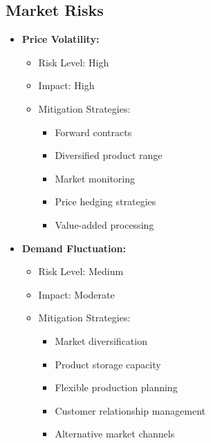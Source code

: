 \subsection{Market Risks}
\begin{itemize}
    \item \textbf{Price Volatility:}
    \begin{itemize}
        \item Risk Level: High
        \item Impact: High
        \item Mitigation Strategies:
        \begin{itemize}
            \item Forward contracts
            \item Diversified product range
            \item Market monitoring
            \item Price hedging strategies
            \item Value-added processing
        \end{itemize}
    \end{itemize}
    
    \item \textbf{Demand Fluctuation:}
    \begin{itemize}
        \item Risk Level: Medium
        \item Impact: Moderate
        \item Mitigation Strategies:
        \begin{itemize}
            \item Market diversification
            \item Product storage capacity
            \item Flexible production planning
            \item Customer relationship management
            \item Alternative market channels
        \end{itemize}
    \end{itemize}
\end{itemize}

